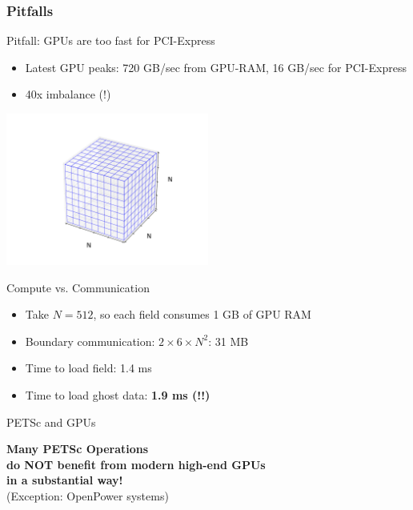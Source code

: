 \begin{frame}[fragile]
\frametitle{Pitfalls}
  \begin{block}{Pitfall: GPUs are too fast for PCI-Express}
  \begin{itemize}
   \item Latest GPU peaks: 720 GB/sec from GPU-RAM, 16 GB/sec for PCI-Express
   \item 40x imbalance (!)
  \end{itemize}
  \end{block}

  \begin{center} \vspace*{-1.0cm}
    \includegraphics[width=0.5\textwidth]{figures/cube-discretization}
  \end{center}

  \vspace*{-0.5cm}
   \begin{block}{Compute vs. Communication}
  \begin{itemize}
   \item Take $N=512$, so each field consumes 1 GB of GPU RAM
   \item Boundary communication: $2 \times 6 \times N^2$: 31 MB
   \item Time to load field: 1.4 ms
   \item Time to load ghost data: \textbf{1.9 ms (!!)}
  \end{itemize}
  \end{block}

\end{frame}


\begin{frame}{PETSc and GPUs}
   \begin{center} \Large \textbf{Many PETSc Operations \\[1em] do NOT benefit from modern high-end GPUs \\[1em] in a substantial way!}\\ \scriptsize (Exception: OpenPower systems) \end{center}
\end{frame}


